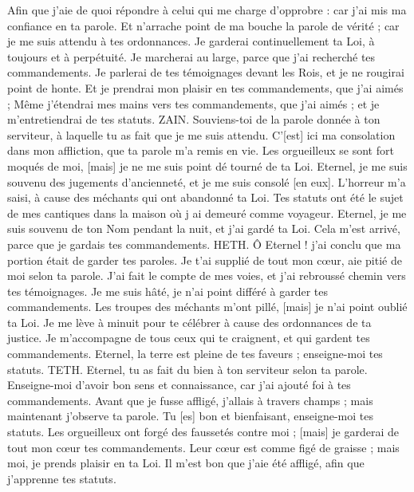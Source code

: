 \begin{multicols}{2}
Afin que j'aie de quoi répondre à celui qui me charge d'opprobre : car j'ai mis ma confiance en ta parole.
Et n'arrache point de ma bouche la parole de vérité ; car je me suis attendu à tes ordonnances.
Je garderai continuellement ta Loi, à toujours et à perpétuité.
Je marcherai au large, parce que j'ai recherché tes commandements.
Je parlerai de tes témoignages devant les Rois, et je ne rougirai point de honte.
Et je prendrai mon plaisir en tes commandements, que j'ai aimés ;
Même j'étendrai mes mains vers tes commandements, que j'ai aimés ; et je m'entretiendrai de tes statuts.
ZAIN. Souviens-toi de la parole donnée à ton serviteur, à laquelle tu as fait que je me suis attendu.
C'[est] ici ma consolation dans mon affliction, que ta parole m'a remis en vie.
Les orgueilleux se sont fort moqués de moi, [mais] je ne me suis point dé tourné de ta Loi.
Eternel, je me suis souvenu des jugements d'ancienneté, et je me suis consolé [en eux].
L'horreur m'a saisi, à cause des méchants qui ont abandonné ta Loi.
Tes statuts ont été le sujet de mes cantiques dans la maison où j ai demeuré comme voyageur.
Eternel, je me suis souvenu de ton Nom pendant la nuit, et j'ai gardé ta Loi.
Cela m'est arrivé, parce que je gardais tes commandements.
HETH. Ô Eternel ! j'ai conclu que ma portion était de garder tes paroles.
Je t'ai supplié de tout mon cœur, aie pitié de moi selon ta parole.
J'ai fait le compte de mes voies, et j'ai rebroussé chemin vers tes témoignages.
Je me suis hâté, je n'ai point différé à garder tes commandements.
Les troupes des méchants m'ont pillé, [mais] je n'ai point oublié ta Loi.
Je me lève à minuit pour te célébrer à cause des ordonnances de ta justice.
Je m'accompagne de tous ceux qui te craignent, et qui gardent tes commandements.
Eternel, la terre est pleine de tes faveurs ; enseigne-moi tes statuts.
TETH. Eternel, tu as fait du bien à ton serviteur selon ta parole.
Enseigne-moi d'avoir bon sens et connaissance, car j'ai ajouté foi à tes commandements.
Avant que je fusse affligé, j'allais à travers champs ; mais maintenant j'observe ta parole.
Tu [es] bon et bienfaisant, enseigne-moi tes statuts.
Les orgueilleux ont forgé des faussetés contre moi ; [mais] je garderai de tout mon cœur tes commandements.
Leur cœur est comme figé de graisse ; mais moi, je prends plaisir en ta Loi.
Il m'est bon que j'aie été affligé, afin que j'apprenne tes statuts.

\end{multicols}
